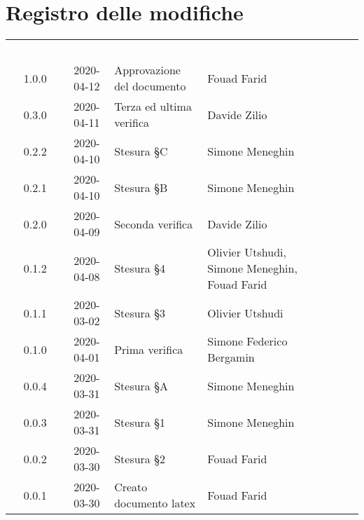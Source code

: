 \section*{Registro delle modifiche}
{
	\centering
	\begin{longtable}{ c c  C{4cm}  C{3.5cm}  C{3.5cm} }
		\textcolor{white}{\textbf{Versione}} & \textcolor{white}{\textbf{Data}} & \textcolor{white}{\textbf{Descrizione}} & \textcolor{white}{\textbf{Nominativo}} & \textcolor{white}{\textbf{Ruolo}}\\		
		1.0.0 & 2020-04-12 & Approvazione del documento & Fouad Farid &\RdP{} \\
		0.3.0 & 2020-04-11 & Terza ed ultima verifica & Davide Zilio &\ver{} \\
		0.2.2 & 2020-04-10 & Stesura \S C & Simone Meneghin &\prog{} \\
		0.2.1 & 2020-04-10 & Stesura \S B & Simone Meneghin &\prog{} \\
		0.2.0 & 2020-04-09 & Seconda verifica & Davide Zilio &\ver{} \\
		0.1.2 & 2020-04-08 & Stesura \S 4 & Olivier Utshudi, Simone Meneghin, Fouad Farid &\prog{} \\
		0.1.1 & 2020-03-02 & Stesura \S 3 & Olivier Utshudi &\prog{} \\
		0.1.0 & 2020-04-01 & Prima verifica & Simone Federico Bergamin &\ver{} \\
		0.0.4 & 2020-03-31 & Stesura \S A & Simone Meneghin &\prog{} \\
		0.0.3 & 2020-03-31 & Stesura \S 1 & Simone Meneghin &\prog{} \\
		0.0.2 & 2020-03-30 & Stesura \S 2 & Fouad Farid &\prog{} \\
		0.0.1 & 2020-03-30 & Creato documento latex & Fouad Farid &\prog{}\\		
		
	\end{longtable}

}